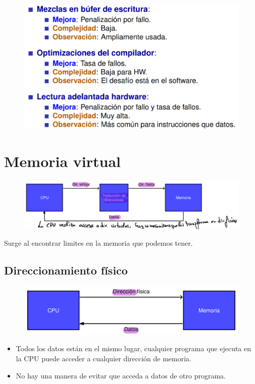 \documentclass[12pt, twoside, openright]{report} %
\begin{document}
  \begin{figure}[H]
    {\includegraphics[scale=.3]{Untitled 25.png}}
  \end{figure}


\section{Memoria virtual}
\begin{figure}[H]
	{\includegraphics[scale=.4]{Untitled 26.png}}
\end{figure}


    Surge al encontrar limites en la memoria que podemos tener.

  \subsection{Direccionamiento físico}
  \begin{figure}[H]
    {\includegraphics[scale=.4]{Untitled 27.png}}
  \end{figure}
  \begin{itemize}
    \item Todos los datos están en el mismo lugar, cualquier programa que ejecuta en la CPU puede acceder a cualquier dirección de memoria.
    \item
    No hay una manera de evitar que acceda a datos de otro programa.
  \end{itemize}
\end{document}
